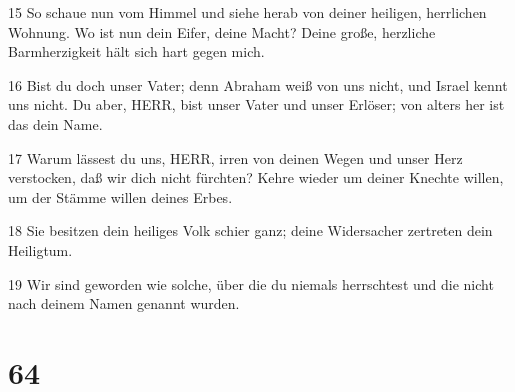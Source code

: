 \par 15 So schaue nun vom Himmel und siehe herab von deiner heiligen, herrlichen Wohnung. Wo ist nun dein Eifer, deine Macht? Deine große, herzliche Barmherzigkeit hält sich hart gegen mich.
\par 16 Bist du doch unser Vater; denn Abraham weiß von uns nicht, und Israel kennt uns nicht. Du aber, HERR, bist unser Vater und unser Erlöser; von alters her ist das dein Name.
\par 17 Warum lässest du uns, HERR, irren von deinen Wegen und unser Herz verstocken, daß wir dich nicht fürchten? Kehre wieder um deiner Knechte willen, um der Stämme willen deines Erbes.
\par 18 Sie besitzen dein heiliges Volk schier ganz; deine Widersacher zertreten dein Heiligtum.
\par 19 Wir sind geworden wie solche, über die du niemals herrschtest und die nicht nach deinem Namen genannt wurden.

\chapter{64}

